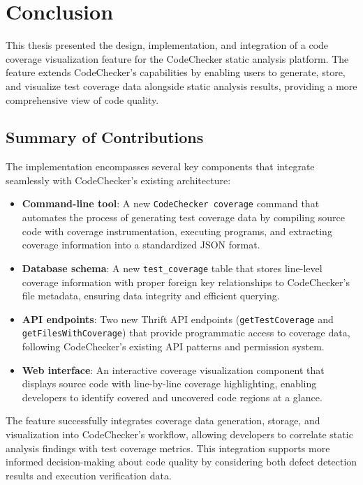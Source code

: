 \chapter{Conclusion}
\label{ch:sum}

This thesis presented the design, implementation, and integration of a code coverage visualization feature for the CodeChecker static analysis platform. The feature extends CodeChecker's capabilities by enabling users to generate, store, and visualize test coverage data alongside static analysis results, providing a more comprehensive view of code quality.

\section{Summary of Contributions}

The implementation encompasses several key components that integrate seamlessly with CodeChecker's existing architecture:

\begin{itemize}
    \item \textbf{Command-line tool}: A new \texttt{CodeChecker coverage} command that automates the process of generating test coverage data by compiling source code with coverage instrumentation, executing programs, and extracting coverage information into a standardized JSON format.
    \item \textbf{Database schema}: A new \texttt{test\_coverage} table that stores line-level coverage information with proper foreign key relationships to CodeChecker's file metadata, ensuring data integrity and efficient querying.
    \item \textbf{API endpoints}: Two new Thrift API endpoints (\texttt{getTestCoverage} and \texttt{getFilesWithCoverage}) that provide programmatic access to coverage data, following CodeChecker's existing API patterns and permission system.
    \item \textbf{Web interface}: An interactive coverage visualization component that displays source code with line-by-line coverage highlighting, enabling developers to identify covered and uncovered code regions at a glance.
\end{itemize}

The feature successfully integrates coverage data generation, storage, and visualization into CodeChecker's workflow, allowing developers to correlate static analysis findings with test coverage metrics. This integration supports more informed decision-making about code quality by considering both defect detection results and execution verification data.

